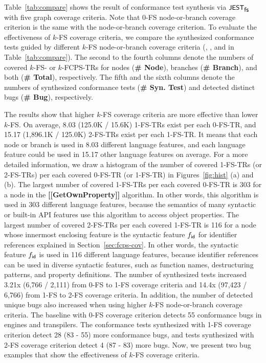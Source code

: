
Table~\ref{tab:compare} shows the result of conformance test synthesis via
$\textsf{\small JEST}_{\textsf{\small fs}}$ with five graph coverage criteria.
%
Note that 0-FS node-or-branch coverage criterion is the same with the node-or-branch
coverage criterion.
%
To evaluate the effectiveness of $k$-FS coverage criteria, we compare the synthesized
conformance tests guided by different $k$-FS node-or-branch coverage criteria
(, , and  in Table~\ref{tab:compare}).
%
The second to the fourth columns denote the numbers of covered $k$-FS- or $k$-FCPS-TRs for
nodes (\textbf{\small \# Node}), branches (\textbf{\small \# Branch}), and both
(\textbf{\small \# Total}), respectively.
%
The fifth and the sixth columns denote the numbers of synthesized conformance tests
(\textbf{\small\# Syn. Test}) and detected distinct bugs
(\textbf{\small\# Bug}), respectively.


The results show that higher $k$-FS coverage criteria are more
effective than lower $k$-FS.
On average, 8.03 (125.0K / 15.6K) 1-FS-TRs exist per each 0-FS-TR, and 15.17 (1,896.1K
/ 125.0K) 2-FS-TRs exist per each 1-FS-TR.
%
It means that each node or branch is used in 8.03 different language features,
and each language feature could be used in 15.17 other language features on average.
%
For a more detailed information, we draw a histogram of the number of covered
1-FS-TRs (or 2-FS-TRs) per each covered 0-FS-TR (or 1-FS-TR) in
Figures~\ref{fig:hist} (a) and (b).
%
The largest number of covered 1-FS-TRs per each covered 0-FS-TR is 303
for a node in the \textbf{[[GetOwnProperty]]} algorithm.
%
In other words, this algorithm is used in 303 different language features,
because the semantics of many syntactic or built-in API features use
this algorithm to access object properties.
%
The largest number of covered 2-FS-TRs per each covered 1-FS-TR is 116
for a node whose innermost enclosing feature is the syntactic feature $f_{\textsf{id}}$
for identifier references explained in Section~\ref{sec:fcps-cov}.
%
In other words, the syntactic feature $f_{\textsf{id}}$ is used in 116 different
language features, because identifier references can be used in
diverse syntactic features, such as function names, destructuring
patterns, and property definitions.
%
The number of synthesized tests increased 3.21x (6,766 / 2,111) from 0-FS to
1-FS coverage criteria and 14.4x (97,423 / 6,766) from 1-FS to 2-FS coverage
criteria.
%
In addition, the number of detected unique bugs also increased when using higher
$k$-FS node-or-branch coverage criteria.
%
The baseline with 0-FS coverage criterion detects 55 conformance bugs in engines
and transpilers.
%
The conformance tests synthesized with 1-FS coverage criterion detect 28
(83 - 55) more conformance bugs, and tests synthesized with 2-FS coverage
criterion detect 4 (87 - 83) more bugs.
%
Now, we present two bug examples that show the effectiveness of $k$-FS coverage
criteria.

